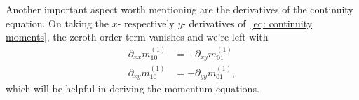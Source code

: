 Another important aspect worth mentioning are the derivatives of the continuity equation.
On taking the $x$- respectively $y$- derivatives of~\eqref{eq: continuity moments}, the zeroth order term vanishes and we're left with
\begin{align}
  \label{eq: continuity derivative x}
  \partial_{xx} m_{10}^{(1)} & = - \partial_{xy} m_{01}^{(1)}\\
  \label{eq: continuity derivative y}
  \partial_{xy} m_{10}^{(1)} & = - \partial_{yy} m_{01}^{(1)},
\end{align}
which will be helpful in deriving the momentum equations.
